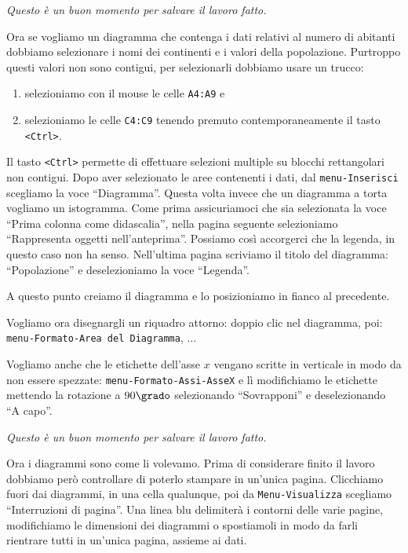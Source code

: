 \emph{Questo è un buon momento per salvare il lavoro fatto.}

Ora se vogliamo un diagramma che contenga i dati relativi al numero di
abitanti dobbiamo selezionare i nomi dei continenti e i valori della
popolazione.
Purtroppo questi valori non sono contigui, per selezionarli
dobbiamo usare un trucco:

\begin{enumerate} [nosep]
\item selezioniamo con il mouse le celle \texttt{A4:A9} e
\item selezioniamo le celle \texttt{C4:C9} tenendo premuto contemporaneamente
il tasto \texttt{\textless{}Ctrl\textgreater{}}.
\end{enumerate}

Il tasto \texttt{\textless{}Ctrl\textgreater{}} permette di effettuare selezioni 
multiple su blocchi
rettangolari non contigui.
Dopo aver selezionato le aree contenenti i dati,
dal \texttt{menu-Inserisci} scegliamo la voce ``Diagramma''.
Questa volta invece che un diagramma a torta vogliamo un istogramma.
Come prima assicuriamoci che sia selezionata la voce
``Prima colonna come didascalia'', nella pagina seguente selezioniamo
``Rappresenta oggetti nell'anteprima''.
Possiamo così accorgerci che la legenda, in questo caso non ha senso.
Nell'ultima pagina scriviamo il titolo del diagramma: ``Popolazione'' e
deselezioniamo la voce ``Legenda''.

A questo punto creiamo il diagramma e lo posizioniamo in fianco al
precedente.

Vogliamo ora disegnargli un riquadro attorno: doppio clic nel diagramma,
poi: \\
\texttt{menu-Formato-Area del Diagramma}, ...

Vogliamo anche che le etichette dell'asse \(x\) vengano scritte in
verticale in modo da non essere spezzate: \texttt{menu-Formato-Assi-AsseX} e
lì modifichiamo le etichette mettendo la rotazione a \(90\grado\)
selezionando ``Sovrapponi'' e deselezionando ``A capo''.

\emph{Questo è un buon momento per salvare il lavoro fatto.}

Ora i diagrammi sono come li volevamo.
Prima di considerare finito il lavoro dobbiamo però controllare di poterlo
stampare in un'unica pagina.
Clicchiamo fuori dai diagrammi, in una cella qualunque,
poi da \texttt{Menu-Visualizza} scegliamo ``Interruzioni di pagina''.
Una linea blu delimiterà i contorni delle varie pagine, modifichiamo le
dimensioni dei diagrammi o spostiamoli in modo da farli rientrare tutti
in un'unica pagina, assieme ai dati.

